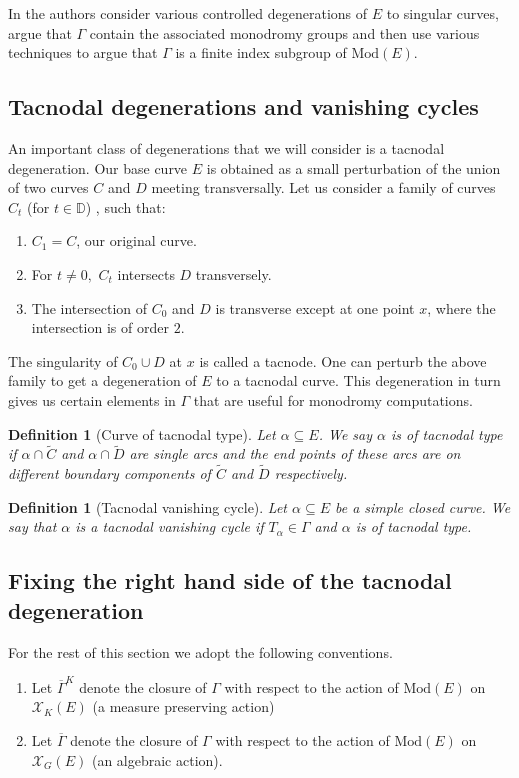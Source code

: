 \documentclass{article}
\newcommand{\XX}{\mathcal{X}}
\newcommand{\DD}{\mathbb{D}}
\newcommand{\Mod}{\textrm{Mod}}
\newtheorem{definition}[theorem]{Definition}
\begin{document}
In \cite{BS} the authors consider various controlled degenerations of $E$ to singular curves, argue that $\Gamma$ contain the associated monodromy groups and then use various techniques to argue that $\Gamma$ is a finite index subgroup of $\Mod(E).$
\subsection{Tacnodal degenerations and vanishing cycles}
An important class of degenerations that we will consider is a tacnodal degeneration. Our base curve $E$ is obtained as a small perturbation of the union of two curves $C$ and $D$ meeting transversally. Let us consider a family of curves $C_t$ (for $t \in \DD$) , such that:
\begin{enumerate}
    \item $C_1 =C$, our original curve.
    \item For $t \neq 0,$ $C_t$ intersects $D$ transversely.
    \item The intersection of $C_0$ and $D$ is transverse except at one point $x$, where the intersection is of order $2.$
\end{enumerate}

The singularity of $C_0 \cup D$ at $x$ is called a tacnode. One can perturb the above family to get a degeneration of $E$ to a tacnodal curve. This degeneration in turn gives us certain elements in $\Gamma$ that are useful for monodromy computations.


\begin{definition}[Curve of tacnodal type]
    Let $\alpha \subseteq E$. We say $\alpha$ is of tacnodal type if $\alpha \cap \tilde C$ and $\alpha \cap \tilde D$ are single arcs and the end points of these arcs are on different boundary components of $\tilde C$ and $\tilde D$ respectively.
\end{definition}

\begin{definition} [Tacnodal vanishing cycle]
    Let $\alpha \subseteq E$ be a simple closed curve. We say that $\alpha$ is a tacnodal vanishing cycle if $T_{\alpha} \in \Gamma $ and $\alpha$ is of tacnodal type.
\end{definition}


\subsection{Fixing the right hand side of the tacnodal degeneration}
For the rest of this section we adopt the following conventions.
    \begin{enumerate}
        \item Let $\overline{\Gamma}^{K}$ denote the closure of $\Gamma$ with respect to the action of $\Mod(E)$ on $\XX_K(E)$ (a measure preserving action)
        \item Let $\overline{\Gamma}$ denote the closure of $\Gamma$ with respect to the action of $\Mod(E)$ on $\XX_G(E)$ (an algebraic action).
    \end{enumerate}
\end{document}
